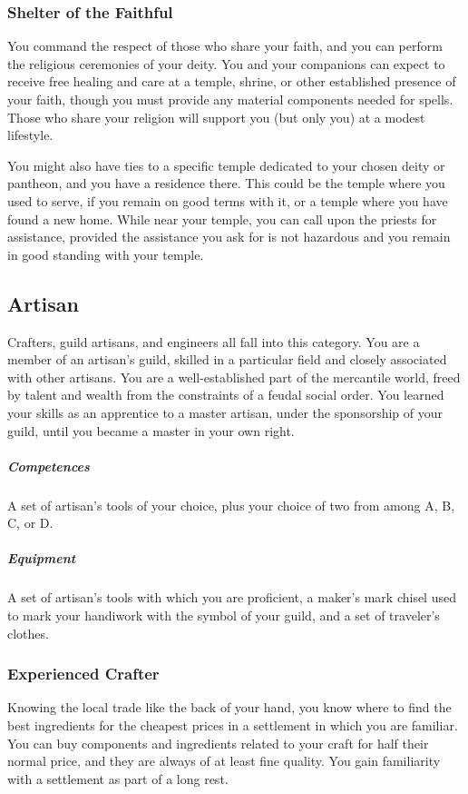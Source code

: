     \subsubsection{Shelter of the Faithful} \label{feat::shelterofthefaithful}
        You command the respect of those who share your faith, and you can perform the religious ceremonies of your deity.
        You and your companions can expect to receive free healing and care at a temple, shrine, or other established presence of your faith, though you must provide any material components needed for spells.
        Those who share your religion will support you (but only you) at a modest lifestyle.

        You might also have ties to a specific temple dedicated to your chosen deity or pantheon, and you have a residence there.
        This could be the temple where you used to serve, if you remain on good terms with it, or a temple where you have found a new home.
        While near your temple, you can call upon the priests for assistance, provided the assistance you ask for is not hazardous and you remain in good standing with your temple.

\subsection*{Artisan} \label{ssec::artisan} %
    Crafters, guild artisans, and engineers all fall into this category.
    You are a member of an artisan's guild, skilled in a particular field and closely associated with other artisans.
    You are a well-established part of the mercantile world, freed by talent and wealth from the constraints of a feudal social order.
    You learned your skills as an apprentice to a master artisan, under the sponsorship of your guild, until you became a master in your own right.
    \subparagraph{Competences} A set of artisan's tools of your choice, plus your choice of two from among A, B, C, or D.
    \subparagraph{Equipment} A set of artisan's tools with which you are proficient, a maker's mark chisel used to mark your handiwork with the symbol of your guild, and a set of traveler's clothes.
    \subsubsection{Experienced Crafter} \label{feat::experiencedcrafter}
        Knowing the local trade like the back of your hand, you know where to find the best ingredients for the cheapest prices in a settlement in which you are familiar.
        You can buy components and ingredients related to your craft for half their normal price, and they are always of at least fine quality.
        You gain familiarity with a settlement as part of a long rest.

